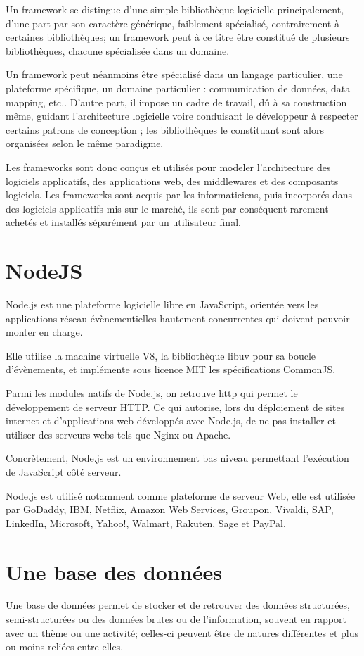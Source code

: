 Un framework se distingue d'une simple bibliothèque logicielle principalement,
d'une part par son caractère générique, faiblement spécialisé, contrairement à
certaines bibliothèques; un framework peut à ce titre être constitué de plusieurs
bibliothèques, chacune spécialisée dans un domaine.

Un framework peut néanmoins être spécialisé dans un langage particulier,
une plateforme spécifique, un domaine particulier : communication de données,
data mapping, etc.. D'autre part, il impose un cadre de travail, dû à sa construction même,
 guidant l'architecture logicielle voire conduisant le développeur à respecter certains
 patrons de conception ; les bibliothèques le constituant sont alors organisées selon le même paradigme.

Les frameworks sont donc conçus et utilisés pour modeler l'architecture des logiciels applicatifs,
des applications web, des middlewares et des composants logiciels. Les frameworks sont
acquis par les informaticiens, puis incorporés dans des logiciels applicatifs mis sur
le marché, ils sont par conséquent rarement achetés et installés séparément par un utilisateur final.

\section{NodeJS}\label{sec:nodejs}
Node.js\cite{nodejs} est une plateforme logicielle libre en JavaScript, orientée vers les applications
réseau évènementielles hautement concurrentes qui doivent pouvoir monter en charge.

Elle utilise la machine virtuelle V8, la bibliothèque libuv pour sa boucle d'évènements,
et implémente sous licence MIT les spécifications CommonJS.

Parmi les modules natifs de Node.js, on retrouve http qui permet le développement de
serveur HTTP. Ce qui autorise, lors du déploiement de sites internet et d'applications
web développés avec Node.js, de ne pas installer et utiliser des serveurs webs tels que Nginx ou Apache.

Concrètement, Node.js est un environnement bas niveau permettant l'exécution de JavaScript côté serveur.

Node.js est utilisé notamment comme plateforme de serveur Web, elle est utilisée par GoDaddy, IBM,
Netflix, Amazon Web Services, Groupon, Vivaldi, SAP, LinkedIn, Microsoft, Yahoo!,
Walmart, Rakuten, Sage et PayPal.

\section{Une base des données}\label{sec:base-de-donnees}
Une base de données\cite{base_donnees} permet de stocker et de retrouver des données structurées,
semi-structurées ou des données brutes ou de l'information, souvent en
rapport avec un thème ou une activité; celles-ci peuvent être de
natures différentes et plus ou moins reliées entre elles.

